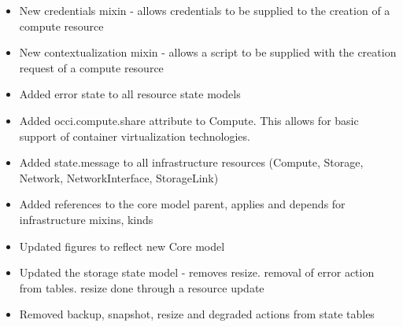 \documentclass[10pt,a4paper]{article}
\begin{document}
\begin{itemize}
\item New credentials mixin - allows credentials to be supplied to the creation of a compute resource
\item New contextualization mixin - allows a script to be supplied with the creation request of a compute resource
\item Added error state to all resource state models
\item Added occi.compute.share attribute to Compute. This allows for basic support of container virtualization technologies.
\item Added state.message to all infrastructure resources (Compute, Storage, Network, NetworkInterface, StorageLink)
\item Added references to the core model parent, applies and depends for infrastructure mixins, kinds
\item Updated figures to reflect new Core model
\item Updated the storage state model - removes resize. removal of error action from tables. resize done through a resource update
\item Removed backup, snapshot, resize and degraded actions from state tables
\end{itemize}
\end{document}
